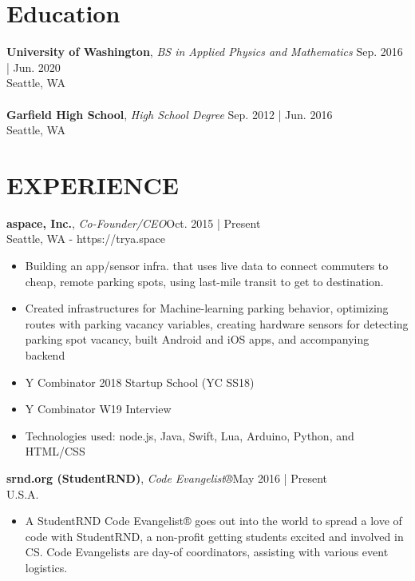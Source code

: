 \documentclass[line,margin]{res}
\begin{document}
\address{me@f3d0r.com | (206) 372-8476 | Seattle, WA | f3d0r.com}
\begin{resume}
	\vspace{-5mm}
	        
	
	\section{Education}
	\textbf{University of Washington}, {\sl BS in Applied Physics and Mathematics} \hfill Sep. 2016 | Jun. 2020\\Seattle, WA\\\\
	\textbf{Garfield High School}, {\sl High School Degree} \hfill Sep. 2012 | Jun. 2016\\Seattle, WA
	\section{EXPERIENCE}
	\textbf{aspace, Inc.}, {\sl Co-Founder/CEO}\hfill Oct. 2015 | Present\\Seattle, WA - https://trya.space\\\begin{itemize} \itemsep 3pt
	\item Building an app/sensor infra. that uses live data to connect commuters to cheap, remote parking spots, using last-mile transit to get to destination.
	\item Created infrastructures for Machine-learning parking behavior, optimizing routes with parking vacancy variables, creating hardware sensors for detecting parking spot vacancy, built Android and iOS apps, and accompanying backend
	\item Y Combinator 2018 Startup School (YC SS18)
	\item Y Combinator W19 Interview
	\item Technologies used: node.js, Java, Swift, Lua, Arduino, Python, and HTML/CSS
	\end{itemize}
	\textbf{srnd.org (StudentRND)}, {\sl Code Evangelist®}\hfill May 2016 | Present\\U.S.A.\\\begin{itemize} \itemsep 3pt
	\item A StudentRND Code Evangelist® goes out into the world to spread a love of code with StudentRND, a non-profit getting students excited and involved in CS. Code Evangelists are day-of coordinators, assisting with various event logistics.
	\end{itemize}

\end{resume}
\end{document}
